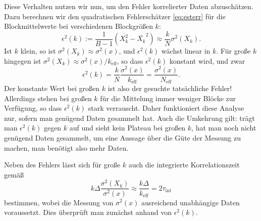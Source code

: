Diese Verhalten nutzen wir nun, um den Fehler korrelierter Daten
abzuschätzen. Dazu berechnen wir den quadratischen Fehlerschätzer
\eqref{eq:esterr} für die Blockmittelwerte bei verschiedenen
Blockgrößen $k$:
\begin{equation}
  \epsilon^2(k) := \frac{1}{B - 1} \left(\overline{X_k^2} -
    \overline{X_k}^2\right) \approx \frac{k}{N} \sigma^2(X_k).
\end{equation}
Ist $k$ klein, so ist $\sigma^2(X_k)\approx \sigma^2(x)$, und
$\epsilon^2(k)$ wächst linear in $k$. Für große $k$ hingegen ist
$\sigma^2(X_k) \approx \sigma^2(x)/k_\text{eff}$, so dass
$\epsilon^2(k)$ konstant wird, und zwar
\begin{equation}
  \epsilon^2(k)= \frac{k}{N}\frac{\sigma^2(x)}{k_\text{eff}} =
  \frac{\sigma^2(x)}{N_\text{eff}}.
\end{equation}
Der konstante Wert bei großen $k$ ist also der gesuchte tatsächliche
Fehler!  Allerdings stehen bei großen $k$ für die Mittelung immer
weniger Blöcke zur Verfügung, so dass $\epsilon^2(k)$ stark
verrauscht. Daher funktioniert diese Analyse nur, sofern man genügend
Daten gesammelt hat. Auch die Umkehrung gilt: trägt man
$\epsilon^2(k)$ gegen $k$ auf und sieht kein Plateau bei großen $k$,
hat man noch nicht genügend Daten gesammelt, um eine Aussage über die
Güte der Messung zu machen, man benötigt also mehr Daten.

Neben des Fehlers lässt sich für große $k$ auch die integrierte
Korrelationszeit gemäß
\begin{equation}
  \label{eq:tauint}
  k \Delta\frac{\sigma^2(X_k)}{\sigma^2(x)} \approx
  \frac{k\Delta}{k_\text{eff}} = 2\tau_\text{int}
\end{equation}
bestimmen, wobei die Messung von $\sigma^2(x)$ ausreichend unabhängige
Daten voraussetzt. Dies überprüft man zunächst anhand von
$\epsilon^2(k)$.

